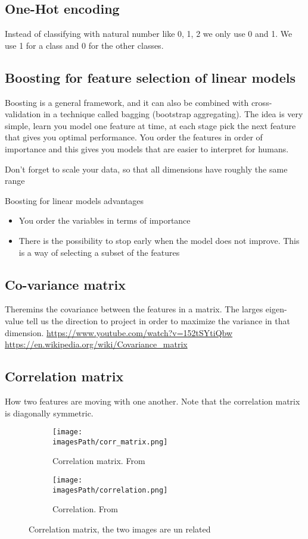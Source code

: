 \subsection{One-Hot encoding}
Instead of classifying with natural number like 0, 1, 2 we only 
use 0 and 1. We use 1 for a class and 0 for the other classes.

\subsection{Boosting for feature selection of linear models}
Boosting is a general framework, and it can also be combined with
cross-validation in a technique called bagging (bootstrap aggregating).
The idea is very simple, learn you model one feature at time, at each stage
pick the next feature that gives you optimal performance.
You order the features in order of importance and this gives you models
that are easier to interpret for humans.

Don’t forget to scale your data, so that all dimensions have roughly the
same range

Boosting for linear models advantages
\begin{itemize}
    \item You order the variables in terms of importance
    \item There is the possibility to stop early when the model does not
improve. This is a way of selecting a subset of the features
\end{itemize}

\subsection{Co-variance matrix}
Theremins the covariance between the features in a matrix. 
The larges eigen-value tell us the direction to project in order to 
maximize the variance in that dimension.
\url{https://www.youtube.com/watch?v=152tSYtiQbw}
\url{https://en.wikipedia.org/wiki/Covariance_matrix}


\subsection{Correlation matrix}
How two features are moving with one another. Note that the correlation matrix is diagonally symmetric.
\begin{figure}[!h]
     \centering
     \begin{subfigure}[b]{0.35\textwidth}
         \centering
         \texttt{[image: \\imagesPath/corr\_matrix.png]}
         \caption{Correlation matrix. From \cite{}}
     \end{subfigure}
     \hfill
     \begin{subfigure}[b]{0.55\textwidth}
         \centering
         \texttt{[image: \\imagesPath/correlation.png]}
         \caption{Correlation. From \cite{}}
     \end{subfigure}
    \caption{Correlation matrix, the two images are un related}
\end{figure}


